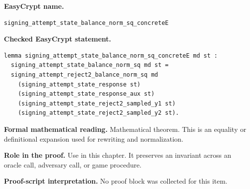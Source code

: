 \begin{formaltheorem}
\noindent\textbf{EasyCrypt name.}
\begin{lstlisting}[language=EasyCrypt,basicstyle=\ttfamily\scriptsize]
signing_attempt_state_balance_norm_sq_concreteE
\end{lstlisting}
\noindent\textbf{Checked EasyCrypt statement.}
\begin{lstlisting}[language=EasyCrypt,basicstyle=\ttfamily\scriptsize]
lemma signing_attempt_state_balance_norm_sq_concreteE md st :
  signing_attempt_state_balance_norm_sq md st =
  signing_attempt_reject2_balance_norm_sq md
    (signing_attempt_state_response st)
    (signing_attempt_state_response_aux st)
    (signing_attempt_state_reject2_sampled_y1 st)
    (signing_attempt_state_reject2_sampled_y2 st).
\end{lstlisting}
\noindent\textbf{Formal mathematical reading.}
Mathematical theorem. This is an equality or definitional expansion used for rewriting and normalization.

\noindent\textbf{Role in the proof.}
Use in this chapter. It preserves an invariant across an oracle call, adversary call, or game procedure.

\noindent\textbf{Proof-script interpretation.}
No proof block was collected for this item.

\end{formaltheorem}

